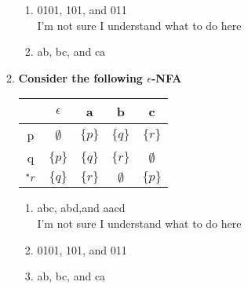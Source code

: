 \begin{enumerate}
\begin{enumerate}
\begin{enumerate}
			\item 0101, 101, and 011
			\\ I'm not sure I understand what to do here
			\item ab, bc, and ca 
		\end{enumerate}

	\item \textbf{Consider the following $\epsilon$-NFA}

		\begin{table}[H]
				\centering
		\begin{tabular}{c||c|c|c|c}
			&  $\epsilon$ &  a   & b & c\\ \hline
			p&  $\emptyset$ &  $\{p\}$  & $\{q\}$& $\{r\}$ \\ \hline
			q&  $\{p\}$& $\{q\}$   & $\{r\}$ &  $\emptyset$\\ \hline
			${}^\ast r$&  $\{q\}$& $\{r\}$ &  $\emptyset$ & $\{p\}$ \\ \hline
		\end{tabular}
	\end{table}

			\begin{enumerate}
		\item abc, abd,and aacd 
					\\ I'm not sure I understand what to do here
		\item 0101, 101, and 011
		\item ab, bc, and ca 
	\end{enumerate}
\end{enumerate}

\end{enumerate}


